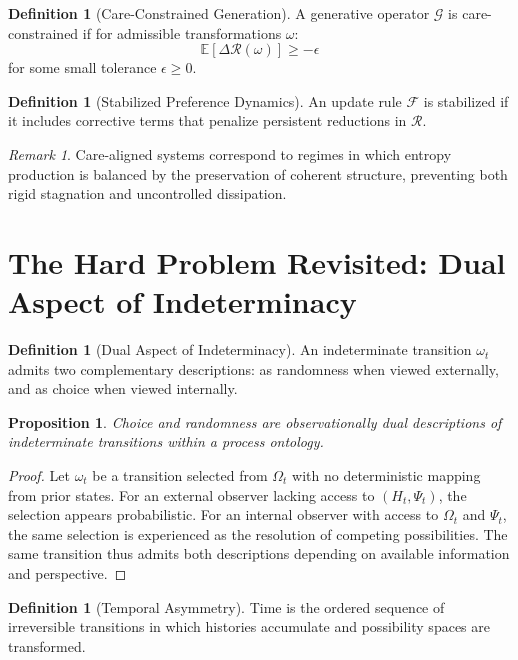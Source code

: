 \documentclass[11pt,a4paper]{article}
\newtheorem{proposition}[theorem]{Proposition}
\theoremstyle{definition}
\newtheorem{definition}[theorem]{Definition}
\theoremstyle{remark}
\newtheorem{remark}[theorem]{Remark}
\begin{document}
\begin{definition}[Care-Constrained Generation]
A generative operator $\mathcal{G}$ is care-constrained if for admissible transformations $\omega$:
\[
\mathbb{E}[\Delta \mathcal{R}(\omega)] \geq -\epsilon
\]
for some small tolerance $\epsilon \geq 0$.
\end{definition}

\begin{definition}[Stabilized Preference Dynamics]
An update rule $\mathcal{F}$ is stabilized if it includes corrective terms that penalize persistent reductions in $\mathcal{R}$.
\end{definition}

\begin{remark}
Care-aligned systems correspond to regimes in which entropy production is balanced by the preservation of coherent structure, preventing both rigid stagnation and uncontrolled dissipation.
\end{remark}

\section{The Hard Problem Revisited: Dual Aspect of Indeterminacy}

\begin{definition}[Dual Aspect of Indeterminacy]
An indeterminate transition $\omega_t$ admits two complementary descriptions: as randomness when viewed externally, and as choice when viewed internally.
\end{definition}

\begin{proposition}
Choice and randomness are observationally dual descriptions of indeterminate transitions within a process ontology.
\end{proposition}

\begin{proof}
Let $\omega_t$ be a transition selected from $\Omega_t$ with no deterministic mapping from prior states. For an external observer lacking access to $(H_t, \Psi_t)$, the selection appears probabilistic. For an internal observer with access to $\Omega_t$ and $\Psi_t$, the same selection is experienced as the resolution of competing possibilities. The same transition thus admits both descriptions depending on available information and perspective.
\end{proof}

\begin{definition}[Temporal Asymmetry]
Time is the ordered sequence of irreversible transitions in which histories accumulate and possibility spaces are transformed.
\end{definition}
\end{document}
